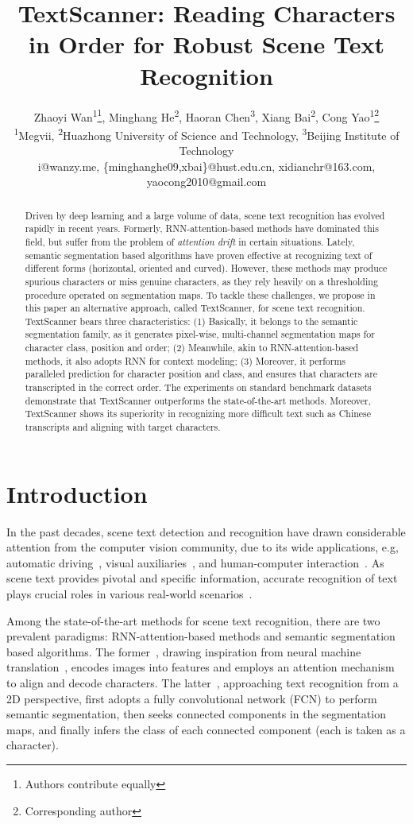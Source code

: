 \documentclass[letterpaper]{article} \usepackage{aaai20}  \usepackage{times}  \usepackage{helvet} \usepackage{courier}  \usepackage[hyphens]{url}  \usepackage{graphicx} \urlstyle{rm} \def\UrlFont{\rm}  \usepackage{graphicx}  \frenchspacing  \setlength{\pdfpagewidth}{8.5in}  \setlength{\pdfpageheight}{11in}
\title{TextScanner: Reading Characters in Order for Robust Scene Text Recognition}
\author{Zhaoyi Wan\textsuperscript{\rm 1}\footnotemark[\value{footnote}]\thanks{Authors contribute equally},
Minghang He\textsuperscript{\rm 2}\footnotemark[\value{footnote}],
Haoran Chen\textsuperscript{\rm 3},
Xiang Bai\textsuperscript{\rm 2},
Cong Yao\textsuperscript{\rm 1}\thanks{Corresponding author}\\
\textsuperscript{\rm 1}Megvii,
\textsuperscript{\rm 2}Huazhong University of Science and Technology,
\textsuperscript{\rm 3}Beijing Institute of Technology\\
i@wanzy.me, \{minghanghe09,xbai\}@hust.edu.cn, xidianchr@163.com, yaocong2010@gmail.com
}
\begin{document}
\maketitle
\begin{abstract}
Driven by deep learning and a large volume of data, scene text recognition has evolved rapidly in recent years. Formerly, RNN-attention-based methods have dominated this field, but suffer from the problem of \textit{attention drift} in certain situations. Lately, semantic segmentation based algorithms have proven effective at recognizing text of different forms (horizontal, oriented and curved). However, these methods may produce spurious characters or miss genuine characters, as they rely heavily on a thresholding procedure operated on segmentation maps. To tackle these challenges, we propose in this paper an alternative approach, called TextScanner, for scene text recognition. TextScanner bears three characteristics: (1) Basically, it belongs to the semantic segmentation family, as it generates pixel-wise, multi-channel segmentation maps for character class, position and order; (2) Meanwhile, akin to RNN-attention-based methods, it also adopts RNN for context modeling; (3) Moreover, it performs paralleled prediction for character position and class, and ensures that characters are transcripted in the correct order. The experiments on standard benchmark datasets demonstrate that TextScanner outperforms the state-of-the-art methods. Moreover, TextScanner shows its superiority in recognizing more difficult text such as Chinese transcripts and aligning with target characters.
\end{abstract}

\section{Introduction}\label{introduction}

In the past decades, scene text detection and recognition have drawn considerable attention from the computer vision community, due to its wide applications, e.g, automatic driving~\cite{ctc}, visual auxiliaries~\cite{visual_attn}, and human-computer interaction~\cite{wang2012end}. As scene text provides pivotal and specific information, accurate recognition of text plays crucial roles in various real-world scenarios~\cite{quy2013recognizing}.


Among the state-of-the-art methods for scene text recognition, there are two prevalent paradigms: RNN-attention-based methods and semantic segmentation based algorithms. The former~\cite{shi2016robust,aon}, drawing inspiration from neural machine translation~\cite{bahdanau2014neural}, encodes images into features and employs an attention mechanism to align and decode characters. The latter~\cite{mask_textspotter,ca-fcn}, approaching text recognition from a 2D perspective, first adopts a fully convolutional network (FCN) to perform semantic segmentation, then seeks connected components in the segmentation maps, and finally infers the class of each connected component (each is taken as a character).
\end{document}
